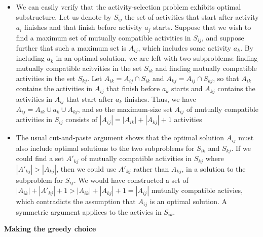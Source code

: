 \documentclass{report}
\begin{document}
\begin{itemize}
    \item We can easily verify that the activity-selection problem exhibits optimal substructure. Let us denote by $S_{ij}$ the set of activities that start after activity $a_i$ finishes and that finish before activity $a_j$ starts. Suppose that we wish to find a maximum set of mutually compatible activities in $S_{ij}$, and suppose further that such a maximum set is $A_{ij}$, which includes some activity $a_k$. By including $a_k$ in an optimal solution, we are left with two subproblems: finding mutually compatible acitvities in the set $S_{ik}$ and finding mutually compatible activities in the set $S_{kj}$. Let $A_{ik} = A_{ij} \cap S_{ik}$ and $A_{kj} = A_{ij} \cap S_{kj}$, so that $A_{ik}$ contains the activities in $A_{ij}$ that finish before $a_k$ starts and $A_{kj}$ contains the activities in $A_{ij}$ that start after $a_k$ finishes. Thus, we have $A_{ij} = A_{ik} \cup {a_k} \cup A_{kj}$, and so the maximum-size set $A_{ij}$ of mutually compatible activities in $S_{ij}$ consists of $|A_{ij}| = |A_{ik}| + |A_{kj}| + 1$ activities
    \item The usual cut-and-paste argument shows that the optimal solution $A_{ij}$ must also include optimal solutions to the two subproblems for $S_{ik}$ and $S_{kj}$. If we could find a set $A'_{kj}$ of mutually compatible activities in $S_{kj}$ where $|A'_{kj}| > |A_{kj}|$, then we could use $A'_{kj}$ rather than $A_{kj}$, in a solution to the subproblem for $S_{ij}$. We would have constructed a set of $|A_{ik}| + |A'_{kj}| + 1 > |A_{ik}| + |A_{kj}| + 1 = |A_{ij}|$ mutually compatible activies, which contradicts the assumption that $A_{ij}$ is an optimal solution. A symmetric argument applices to the activies in $S_{ik}$.
\end{itemize}
\textbf{Making the greedy choice}
\end{document}
